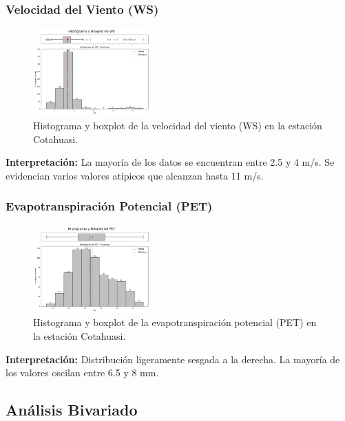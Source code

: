 \subsubsection*{Velocidad del Viento (WS)}
\begin{figure}[H]
\centering
\includegraphics[width=0.4\textwidth]{resultados/por_estacion_meteorologica/Cotahuasi/WS_histograma.png}
\caption{Histograma y boxplot de la velocidad del viento (WS) en la estación Cotahuasi.}
\label{fig:cotahuasi_WS}
\end{figure}
\textbf{Interpretación:} La mayoría de los datos se encuentran entre 2.5 y 4 m/s. Se evidencian varios valores atípicos que alcanzan hasta 11 m/s.

\subsubsection*{Evapotranspiración Potencial (PET)}
\begin{figure}[H]
\centering
\includegraphics[width=0.4\textwidth]{resultados/por_estacion_meteorologica/Cotahuasi/PET_histograma.png}
\caption{Histograma y boxplot de la evapotranspiración potencial (PET) en la estación Cotahuasi.}
\label{fig:cotahuasi_PET}
\end{figure}
\textbf{Interpretación:} Distribución ligeramente sesgada a la derecha. La mayoría de los valores oscilan entre 6.5 y 8 mm.

\subsection{Análisis Bivariado}

